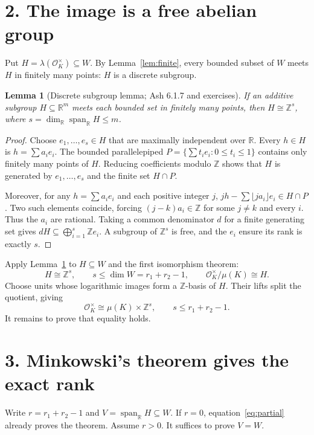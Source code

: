 \documentclass[11pt]{article}
\newtheorem{lemma}{Lemma}
\newcommand{\OK}{\mathcal O_K}
\newcommand{\R}{\mathbb R}
\newcommand{\Z}{\mathbb Z}
\begin{document}
\section*{2. The image is a free abelian group}
Put $H=\lambda(\OK^\times)\subseteq W$. By Lemma~\ref{lem:finite}, every bounded subset of $W$ meets $H$ in finitely many points: $H$ is a discrete subgroup.

\begin{lemma}[Discrete subgroup lemma; Ash 6.1.7 and exercises]\label{lem:discrete}
If an additive subgroup $H\subseteq\R^m$ meets each bounded set in finitely many points, then $H\cong\Z^s$, where $s=\dim_\R\operatorname{span}_\R H\le m$.
\end{lemma}
\begin{proof}
Choose $e_1,\ldots,e_s\in H$ that are maximally independent over $\R$. Every $h\in H$ is $h=\sum a_ie_i$. The bounded parallelepiped $P=\{\sum t_ie_i:0\le t_i\le1\}$ contains only finitely many points of $H$. Reducing coefficients modulo $\Z$ shows that $H$ is generated by $e_1,\ldots,e_s$ and the finite set $H\cap P$.

Moreover, for any $h=\sum a_ie_i$ and each positive integer $j$,
$jh-\sum\lfloor ja_i\rfloor e_i\in H\cap P$. Two such elements coincide, forcing $(j-k)a_i\in\Z$ for some $j\ne k$ and every $i$. Thus the $a_i$ are rational. Taking a common denominator $d$ for a finite generating set gives $dH\subseteq\bigoplus_{i=1}^s\Z e_i$. A subgroup of $\Z^s$ is free, and the $e_i$ ensure its rank is exactly $s$.
\end{proof}

Apply Lemma~\ref{lem:discrete} to $H\subseteq W$ and the first isomorphism theorem:
\[
H\cong\Z^s,\qquad s\le\dim W=r_1+r_2-1,
\qquad \OK^\times/\mu(K)\cong H.
\]
Choose units whose logarithmic images form a $\Z$-basis of $H$. Their lifts split the quotient, giving
\begin{equation}\label{eq:partial}
\boxed{\OK^\times\cong\mu(K)\times\Z^s,\qquad s\le r_1+r_2-1.}
\end{equation}
It remains to prove that equality holds.

\section*{3. Minkowski's theorem gives the exact rank}
Write $r=r_1+r_2-1$ and $V=\operatorname{span}_\R H\subseteq W$. If $r=0$, equation~\eqref{eq:partial} already proves the theorem. Assume $r>0$. It suffices to prove $V=W$.
\end{document}
